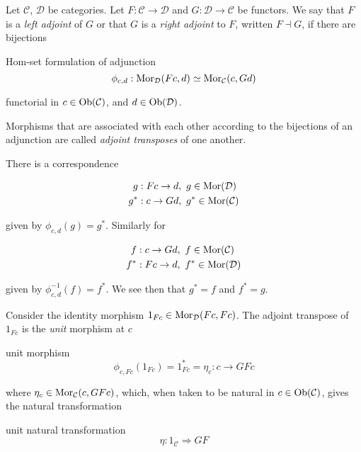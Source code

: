 \begin{frame}
Let $\mathcal{C}$, $\mathcal{D}$ be categories.
Let $F : \mathcal{C} \to \mathcal{D}$ and
$G : \mathcal{D} \to \mathcal{C}$ be functors.
We say that $F$ is a {\it left adjoint} of $G$ or that
$G$ is a {\it right adjoint} to $F$, written $F \dashv G$, if there are bijections
\begin{block}{Hom-set formulation of adjunction}
$$
\phi_{c,d}:\mathop{\rm Mor}\nolimits_\mathcal{D}(Fc, d)
\simeq
\mathop{\rm Mor}\nolimits_\mathcal{C}(c, Gd)
$$
\end{block}
functorial in $c \in \mathop{\rm Ob}\nolimits(\mathcal{C})$, and
$d \in \mathop{\rm Ob}\nolimits(\mathcal{D})$.
\end{frame}
%
\begin{frame}
Morphisms that are associated with each other according to the bijections of an adjunction are called {\it adjoint transposes} of one another. 

There is a correspondence
\begin{block}{}
\abovedisplayskip=0pt
\begin{align*}
g &: Fc \rightarrow d, \,\, g \in \mathop{\rm Mor}\nolimits(\mathcal{D})\\
g^* &: c \rightarrow Gd, \,\, g^* \in \mathop{\rm Mor}\nolimits(\mathcal{C})
\end{align*}
\end{block}
given by $\phi_{c,d}(g) = g^*$. 
Similarly for 
\begin{block}{}
\abovedisplayskip=0pt
\begin{align*}
f &: c \rightarrow Gd, \,\, f \in \mathop{\rm Mor}\nolimits(\mathcal{C})\\
f^* &: Fc \rightarrow d, \,\, f^* \in \mathop{\rm Mor}\nolimits(\mathcal{D}) 
\end{align*}
\end{block}
given by $\phi_{c,d}^{-1}(f) = f^*$. 
We see then that $g^* = f$ and $f^* = g$.
\end{frame}
%
\begin{frame}
Consider the identity morphism $1_{Fc} \in \mathop{\rm Mor}\nolimits_{\mathcal{D}}(Fc,Fc)$. The adjoint transpose of $1_{Fc}$ is the {\it unit} morphism at $c$
\begin{block}{unit morphism}
\abovedisplayskip=0pt
$$
\phi_{c,Fc}(1_{Fc})=1_{Fc}^*=\eta_c: c \rightarrow GFc
$$
\end{block}
where $\eta_c \in \mathop{\rm Mor}\nolimits_{\mathcal{C}}(c,GFc)$, which, when taken to be natural in $c \in \mathop{\rm Ob}\nolimits(\mathcal{C})$, gives the natural transformation
\begin{block}{unit natural transformation}
\abovedisplayskip=0pt
$$
\eta : 1_{\mathcal{C}} \Rightarrow GF
$$
\end{block}
\end{frame}
